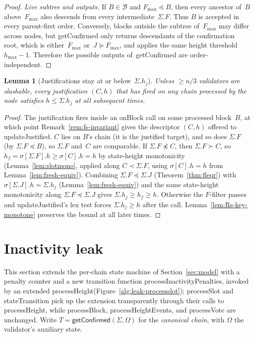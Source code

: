 \documentclass{article}
\newcommand{\hmax}{\ensuremath{h_{\max}}\xspace}
\newcommand{\stateTransition}{\textsf{stateTransition}\xspace}
\newcommand{\processSlot}{\textsf{processSlot}\xspace}
\newcommand{\processBlock}{\textsf{processBlock}\xspace}
\newcommand{\processHeight}{\textsf{processHeight}\xspace}
\newcommand{\processHeightEvents}{\textsf{processHeightEvents}\xspace}
\newcommand{\processVote}{\textsf{processVote}\xspace}
\newcommand{\processInactivityPenalties}{\textsf{processInactivityPenalties}\xspace}
\newcommand{\onBlock}{\textsf{onBlock}\xspace}
\newcommand{\updateJustified}{\textsf{updateJustified}\xspace}
\newcommand{\getConfirmed}{\textsf{getConfirmed}\xspace}
\theoremstyle{plain}
\newtheorem{lemma}{Lemma}
\theoremstyle{definition}
\theoremstyle{remark}
\begin{document}
\begin{proof}
\emph{Live subtree and outputs.} If $B \in \mathcal B$ and $F_{\max} \preceq B$, then every ancestor of~$B$ above~$F_{\max}$ also descends from every intermediate~$\Sigma.F$.
Thus $B$ is accepted in every parent-first order.
Conversely, blocks outside the subtree of~$F_{\max}$ may differ across nodes, but \getConfirmed only returns descendants of the confirmation root, which is either~$F_{\max}$ or~$J \succeq F_{\max}$, and applies the same height threshold~$\hmax-1$.
Therefore the possible outputs of~\getConfirmed are order-independent.
\end{proof}

\begin{lemma}[Justifications stay at or below~$\Sigma.h_j$]\label{lem:no-high-just}
Unless $\geq n/3$ validators are slashable, every justification $(C, h)$ that has fired on any chain processed by the node satisfies $h \leq \Sigma.h_j$ at all subsequent times.
\end{lemma}

\begin{proof}
The justification fires inside an \onBlock call on some processed block~$B$, at which point Remark~\ref{rem:fs-invariant} gives the descriptor $(C, h)$ offered to \updateJustified.
$C$ lies on $B$'s chain (it is the justified target), and so does $\Sigma.F$ (by $\Sigma.F \preceq B$), so $\Sigma.F$ and~$C$ are comparable.
If $\Sigma.F \not\preceq C$, then $\Sigma.F \succ C$, so $h_f = \sigma[\Sigma.F].h \geq \sigma[C].h = h$ by state-height monotonicity (Lemma~\ref{lem:slotmono}, applied along $C \prec \Sigma.F$, using $\sigma[C].h = h$ from Lemma~\ref{lem:fresh-equiv}).
Combining $\Sigma.F \preceq \Sigma.J$ (Theorem~\ref{thm:fleqr}) with $\sigma[\Sigma.J].h = \Sigma.h_j$ (Lemma~\ref{lem:fresh-equiv}) and the same state-height monotonicity along $\Sigma.F \preceq \Sigma.J$ gives $\Sigma.h_j \geq h_f \geq h$.
Otherwise the $F$-filter passes and \updateJustified's lex test forces $\Sigma.h_j \geq h$ after the call.
Lemma~\ref{lem:Rs-key-monotone} preserves the bound at all later times.
\end{proof}

\section{Inactivity leak}\label{sec:leak}

This section extends the per-chain state machine of Section~\ref{sec:model} with a penalty counter and a new transition function \processInactivityPenalties, invoked by an extended \processHeight (Figure~\ref{alg:leak-processslot}); \processSlot and \stateTransition pick up the extension transparently through their calls to \processHeight, while \processBlock, \processHeightEvents, and \processVote are unchanged.
Write $T = \getConfirmed(\Sigma, \Omega)$ for the \emph{canonical chain}, with $\Omega$ the validator's auxiliary state.
\end{document}

